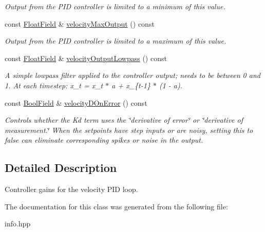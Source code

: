 \begin{DoxyCompactItemize}
\begin{DoxyCompactList}\small\item\em Output from the P\+ID controller is limited to a minimum of this value. \end{DoxyCompactList}\item 
\mbox{\label{classhebi_1_1Info_1_1Settings_1_1Actuator_1_1VelocityGains_a7a3bc7815e6ca29d9ef6bce47383d44a}} 
const \hyperlink{classhebi_1_1Info_1_1FloatField}{Float\+Field} \& \hyperlink{classhebi_1_1Info_1_1Settings_1_1Actuator_1_1VelocityGains_a7a3bc7815e6ca29d9ef6bce47383d44a}{velocity\+Max\+Output} () const
\begin{DoxyCompactList}\small\item\em Output from the P\+ID controller is limited to a maximum of this value. \end{DoxyCompactList}\item 
\mbox{\label{classhebi_1_1Info_1_1Settings_1_1Actuator_1_1VelocityGains_a263735df9a41e39f820c5b88112e8427}} 
const \hyperlink{classhebi_1_1Info_1_1FloatField}{Float\+Field} \& \hyperlink{classhebi_1_1Info_1_1Settings_1_1Actuator_1_1VelocityGains_a263735df9a41e39f820c5b88112e8427}{velocity\+Output\+Lowpass} () const
\begin{DoxyCompactList}\small\item\em A simple lowpass filter applied to the controller output; needs to be between 0 and 1. At each timestep\+: x\+\_\+t = x\+\_\+t $\ast$ a + x\+\_\+\{t-\/1\} $\ast$ (1 -\/ a). \end{DoxyCompactList}\item 
\mbox{\label{classhebi_1_1Info_1_1Settings_1_1Actuator_1_1VelocityGains_ab448146439d8a6df5b55087495667b25}} 
const \hyperlink{classhebi_1_1Info_1_1BoolField}{Bool\+Field} \& \hyperlink{classhebi_1_1Info_1_1Settings_1_1Actuator_1_1VelocityGains_ab448146439d8a6df5b55087495667b25}{velocity\+D\+On\+Error} () const
\begin{DoxyCompactList}\small\item\em Controls whether the Kd term uses the \char`\"{}derivative of error\char`\"{} or \char`\"{}derivative of measurement.\char`\"{} When the setpoints have step inputs or are noisy, setting this to {\ttfamily false} can eliminate corresponding spikes or noise in the output. \end{DoxyCompactList}\end{DoxyCompactItemize}


\subsection{Detailed Description}
Controller gains for the velocity P\+ID loop. 

The documentation for this class was generated from the following file\+:\begin{DoxyCompactItemize}
\item 
info.\+hpp\end{DoxyCompactItemize}
